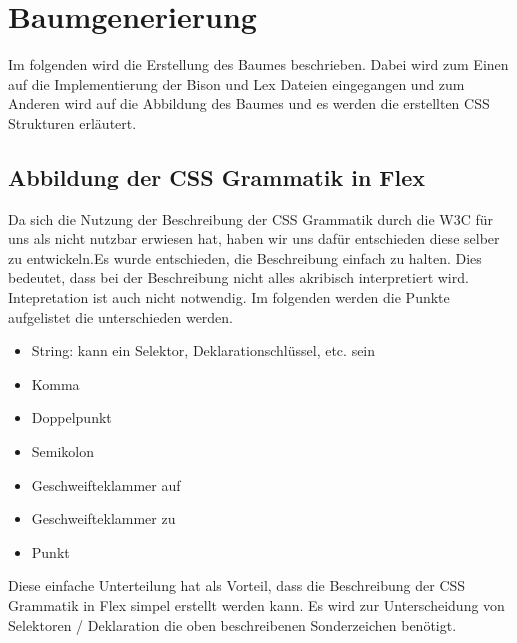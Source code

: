 \section{Baumgenerierung}
Im folgenden wird die Erstellung des Baumes beschrieben. Dabei wird zum Einen auf die Implementierung der Bison und Lex Dateien eingegangen und zum Anderen wird auf die Abbildung des Baumes und es werden die erstellten CSS Strukturen erläutert.

\subsection{Abbildung der CSS Grammatik in Flex}
\label{tree_generation_lex}
Da sich die Nutzung der Beschreibung der CSS Grammatik durch die W3C für uns als nicht nutzbar erwiesen hat, haben wir uns dafür entschieden diese selber zu entwickeln.Es wurde entschieden, die Beschreibung einfach zu halten. Dies bedeutet, dass bei der Beschreibung nicht alles akribisch interpretiert wird. Intepretation ist auch nicht notwendig. Im folgenden werden die Punkte aufgelistet die unterschieden werden. 
\begin{itemize}
\item{String: kann ein Selektor, Deklarationschlüssel, etc. sein} 
\item{Komma} 
\item{Doppelpunkt} 
\item{Semikolon} 
\item{Geschweifteklammer auf} 
\item{Geschweifteklammer zu} 
\item{Punkt} 
\end{itemize}
Diese einfache Unterteilung hat als Vorteil, dass die Beschreibung der CSS Grammatik in Flex simpel erstellt werden kann. Es wird zur Unterscheidung von Selektoren / Deklaration die oben beschreibenen Sonderzeichen benötigt. 
